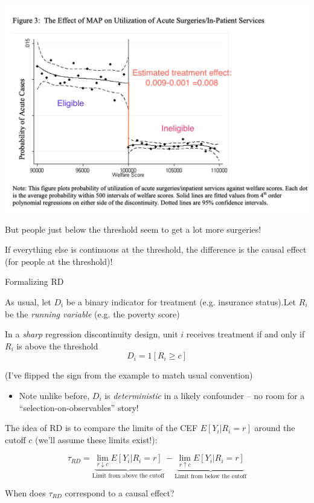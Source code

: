 \documentclass[11pt,english,handout]{beamer}
\newenvironment{wideitemize}{\itemize\addtolength{\itemsep}{10pt}}{\enditemize}
\begin{document}
	\begin{frame}
	\centering
	\includegraphics[width = 0.7\linewidth]{hou-rdd-treatment-effect}
	\begin{wideitemize}		
		\item
		But people just below the threshold seem to get a lot more surgeries!
		
		\item
		If everything else is continuous at the threshold, the difference is the causal effect (for people at the threshold)!
	\end{wideitemize}	
\end{frame}

\begin{frame}{Formalizing RD}
	\begin{wideitemize}
		\item
		As usual, let $D_i$ be a binary indicator for treatment (e.g. insurance status).\pause Let $R_i$ be the \textit{running variable} (e.g. the poverty score)
		
		\pause
		\item
		In a \textit{sharp} regression discontinuity design, unit $i$ receives treatment if and only if $R_i$ is above the threshold
		$$D_i = 1[ R_i \geq c ] $$
		
		(I've flipped the sign from the example to match usual convention)
		\pause\smallskip
		\begin{itemize}
		\item Note unlike before, $D_i$ is \emph{deterministic} in a likely confounder -- no room for a ``selection-on-observables'' story!
		\end{itemize}
		\item 
		The idea of RD is to compare the limits of the CEF $E[Y_i | R_i =r]$ around the cutoff $c$ (we'll assume these limits exist!):
		
		$$\tau_{RD} = \underbrace{ \lim_{r \downarrow c} E[Y_{i} | R_i = r] }_{\text{Limit from above the cutoff} }- \underbrace{\lim_{r \uparrow c} E[Y_{i} | R_i = r]}_{\text{Limit from below the cutoff} } $$
		

		\pause
		\item 
		When does $\tau_{RD}$ correspond to a causal effect? 
	\end{wideitemize}
\end{frame}
\end{document}
